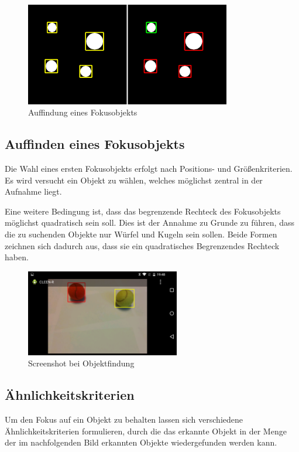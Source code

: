 \pagebreak

\begin{figure}[h]
\centering
\includegraphics[width=0.8\textwidth]{Bilder/Workloop/Markierung}
\caption{Auffindung eines Fokusobjekts}
\label{fig:Markierung}
\end{figure}

\subsection{Auffinden eines Fokusobjekts}
\label{subsec:Auffindung}
Die Wahl eines ersten Fokusobjekts erfolgt nach Positions- und Größenkriterien. Es wird versucht ein Objekt zu wählen, welches möglichst zentral in der Aufnahme liegt. 

Eine weitere Bedingung ist, dass das begrenzende Rechteck des Fokusobjekts möglichst quadratisch sein soll. Dies ist der Annahme zu Grunde zu führen, dass die zu suchenden Objekte nur Würfel und Kugeln sein sollen. Beide Formen zeichnen sich dadurch aus, dass sie ein quadratisches Begrenzendes Rechteck haben.

\begin{figure}[h]
\centering
\includegraphics[width=0.6\textwidth]{Bilder/Workloop/ObjectFindingScreenshot}
\caption{Screenshot bei Objektfindung}
\label{fig:ObjektfindungScreenshot}
\end{figure}

\subsection{Ähnlichkeitskriterien}
\label{subsec:Similarity}
Um den Fokus auf ein Objekt zu behalten lassen sich verschiedene Ähnlichkeitskriterien formulieren, durch die das erkannte Objekt in der Menge der im nachfolgenden Bild erkannten Objekte wiedergefunden werden kann.



